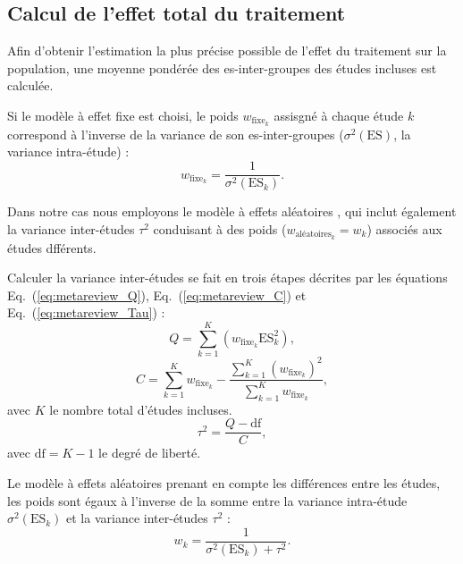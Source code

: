\subsection{Calcul de l'effet total du traitement}

Afin d'obtenir l'estimation la plus précise possible de l'effet du traitement sur la population, une moyenne pondérée des \gls{es}-inter-groupes 
des études incluses est calculée.

Si le modèle à effet fixe est choisi, le poids $w_{\text{fixe}_k}$ assisgné à chaque étude $k$ correspond à l'inverse de la variance de son 
\gls{es}-inter-groupes ($\sigma^2(\text{ES})$, la variance intra-étude) \citep{Borenstein2009} :
\begin{equation}
\label{eq:metareview_weight_fixed_study}
w_{\text{fixe}_k} = \frac{1}{\sigma^2(\text{ES}_k)}.
\end{equation} 

Dans notre cas nous employons le modèle à effets aléatoires \citep{Bussalb2019}, qui inclut également la variance inter-études $\tau^2$ conduisant à des 
poids ($w_{\text{aléatoires}_k} = w_k$) associés aux études dfférents.

Calculer la variance inter-études se fait en trois étapes décrites par les équations Eq.~(\ref{eq:metareview_Q}), Eq.~(\ref{eq:metareview_C}) 
et Eq.~(\ref{eq:metareview_Tau}) \citep{Borenstein2009} :
\begin{equation}
\label{eq:metareview_Q}
Q = \sum_{k=1}^{K} (w_{\text{fixe}_k} \text{ES}_k^2),
\end{equation}
\begin{equation}
\label{eq:metareview_C}
C = \sum_{k=1}^{K} w_{\text{fixe}_k} - \frac{ \sum_{k=1}^{K} (w_{\text{fixe}_k})^2 } { \sum_{k=1}^{K} w_{\text{fixe}_k} },
\end{equation}
avec $K$ le nombre total d'études incluses.
\begin{equation}
\label{eq:metareview_Tau}
\tau^2 = \frac{Q - \text{df}}{C},
\end{equation}
avec $\text{df} = K - 1$ le degré de liberté.

Le modèle à effets aléatoires prenant en compte les différences entre les études, les poids sont égaux à l'inverse de la somme entre la variance intra-étude
$\sigma^2(\text{ES}_k)$ et la variance inter-études $\tau^2$ \citep{Borenstein2009} :
\begin{equation}
\label{eq:metareview_weight_study}
w_k = \frac{1}{\sigma^2(\text{ES}_k) + \tau^2}.
\end{equation} 

